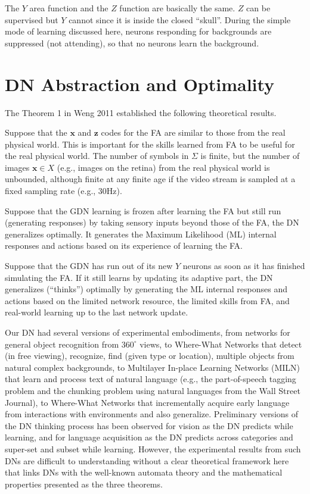 \documentclass[conference]{IEEEtran}
\def\x{\mathbf x}
\def\z{\mathbf z}
\begin{document}
The $Y$ area function and the $Z$ function are basically the same.   $Z$ can be supervised but 
$Y$ cannot since it is inside the closed ``skull''.   
During the simple mode of learning discussed here, neurons responding for
backgrounds are suppressed (not attending), so that no neurons learn the background.   

\section{DN Abstraction and Optimality}
\label{SE:motivation}

The Theorem 1 in Weng 2011 \cite{WengIJCNN11,Weng3ThmRpt11} established the following
theoretical results.  

Suppose that the $\x$ and $\z$ codes for the FA are similar to those from the real physical world. 
This is important for the skills learned from FA to be useful for the real physical world.
The number of symbols in $\Sigma$ is finite, but the number of images $\x \in X$ (e.g., images on the retina) from the real 
physical world is unbounded, although finite at any finite age if the video stream is sampled at a fixed sampling rate (e.g., 
30Hz).
 
Suppose that the GDN learning is frozen after learning the FA 
but still run (generating responses) by taking sensory inputs beyond those of the FA,  
the DN generalizes optimally.  It generates the Maximum Likelihood (ML) internal responses and 
actions based on its experience of learning the FA.

Suppose that the GDN has run out of its new $Y$ neurons as soon as it has finished
simulating the FA.     
If it still learns by updating its adaptive part, the 
DN generalizes (``thinks'') optimally by generating the ML internal responses and actions 
based on the limited network resource, the limited skills from FA, and
real-world learning up to the last network update. 

Our DN had several versions of experimental 
embodiments, from networks for general object recognition from $360^\circ$ views,
to Where-What Networks that detect (in free viewing), recognize, find (given type or location), multiple objects from natural complex backgrounds, to Multilayer In-place Learning Networks (MILN) that learn and process text of natural language (e.g., the part-of-speech tagging problem and the 
chunking problem using natural languages from the Wall Street Journal), to Where-What Networks that 
incrementally acquire early language from interactions with environments and also generalize. 
Preliminary versions of the DN thinking process has been observed for vision 
as the DN predicts while learning, and for language acquisition as the DN predicts across
categories and super-set and subset while learning.   
However, the experimental results from such DNs are difficult to understanding without a clear 
theoretical framework here that links DNs with the well-known automata theory and the mathematical 
properties presented as the three theorems.   
\end{document}
